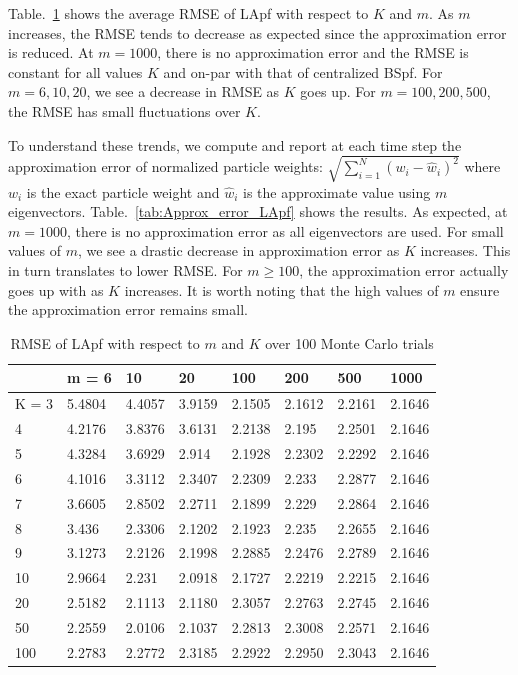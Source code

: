 \documentclass[10pt,letterpaper,final]{article}
\begin{document}
Table.~\ref{tab:RMSE_LApf} shows the average RMSE of LApf with respect to $K$ and $m$. As $m$ increases, the RMSE tends to decrease as expected since the approximation error is reduced.   At $m=1000$, there is no approximation error and the RMSE is constant for all values $K$ and on-par with that of centralized BSpf. For $m=6, 10, 20$, we see a decrease in RMSE as $K$ goes up.  For $m= 100, 200, 500$, the RMSE has small fluctuations over $K$. 

To understand these trends, we compute and report at each time step the approximation error of normalized particle weights: $\sqrt{\sum_{i=1}^N (w_i-\hat{w}_i)^2}$ where $w_i$ is the exact particle weight and $\hat{w}_i$ is the approximate value using $m$ eigenvectors. Table.~\ref{tab:Approx_error_LApf} shows the results. As expected, at $m=1000$, there is no approximation error as all eigenvectors are used. For small values of $m$, we see a drastic decrease in approximation error as $K$ increases. This in turn translates to lower RMSE. For $m\geq 100$, the approximation error actually goes up with as $K$ increases. It is worth noting that the high values of $m$ ensure the approximation error remains small. 

\begin{table}[h!]
\centering
\begin{tabular}{|l|l|l|l|l|l|l|l|}
\hline
        & m = 6  & 10     & 20     & 100    & 200    & 500    & 1000   \\ \hline
K = 3   & 5.4804 & 4.4057 & 3.9159 & 2.1505 & 2.1612 & 2.2161 & 2.1646 \\ \hline
4       & 4.2176 & 3.8376 & 3.6131 & 2.2138 & 2.195  & 2.2501 & 2.1646 \\ \hline
5       & 4.3284 & 3.6929 & 2.914  & 2.1928 & 2.2302 & 2.2292 & 2.1646 \\ \hline
6       & 4.1016 & 3.3112 & 2.3407 & 2.2309 & 2.233  & 2.2877 & 2.1646 \\ \hline
7       & 3.6605 & 2.8502 & 2.2711 & 2.1899 & 2.229  & 2.2864 & 2.1646 \\ \hline
8       & 3.436  & 2.3306 & 2.1202 & 2.1923 & 2.235  & 2.2655 & 2.1646 \\ \hline
9       & 3.1273 & 2.2126 & 2.1998 & 2.2885 & 2.2476 & 2.2789 & 2.1646 \\ \hline
10      & 2.9664 & 2.231  & 2.0918 & 2.1727 & 2.2219 & 2.2215 & 2.1646 \\ \hline
20      & 2.5182 & 2.1113 & 2.1180 & 2.3057 & 2.2763 & 2.2745    & 2.1646 \\ \hline
50      & 2.2559 & 2.0106 & 2.1037 & 2.2813 & 2.3008 & 2.2571    & 2.1646 \\ \hline
100     & 2.2783 & 2.2772 & 2.3185 & 2.2922 & 2.2950 & 2.3043    & 2.1646 \\ \hline
\end{tabular}
\caption{RMSE of LApf with respect to $m$ and $K$ over 100 Monte Carlo trials}
\label{tab:RMSE_LApf}
\end{table}
\end{document}
